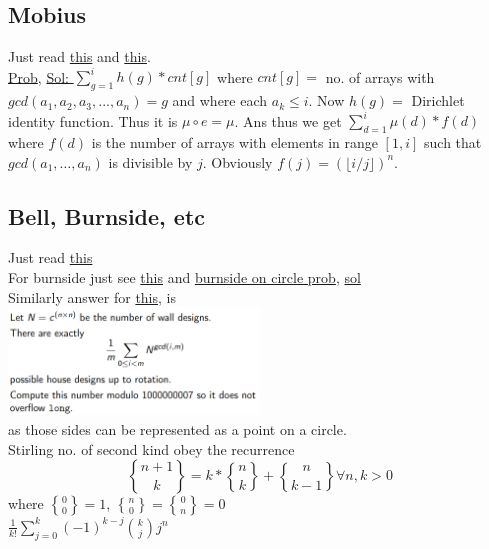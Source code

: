 \documentclass[8pt, a4paper, oneside, twocolumn]{extarticle}
\DeclareRobustCommand{\stirling}{\genfrac\{\}{0pt}{}}
\begin{document}
\subsection{Mobius}
Just read \href{https://github.com/sourabh2311/Competitive-Programming/blob/master/Reference%20Notes/Multiplicative.pdf}{this} and \href{https://www.quora.com/profile/Surya-Kiran/Posts/A-Dance-with-Mobius-Function}{this}.
\\\href{https://codeforces.com/contest/915/problem/G}{Prob}, \href{https://github.com/sourabh2311/Competitive-Programming/blob/master/CF/ER36/G.cpp}{Sol: }$\sum_{g = 1}^{i}h(g)*cnt[g]$ where $cnt[g] = $ no. of arrays with $gcd(a_1, a_2, a_3, ..., a_n) = g$ and where each $a_k \leq i$. Now $h(g) = $ Dirichlet identity function. Thus it is $\mu \circ e = \mu$. Ans thus we get $\sum_{d = 1}^{i}\mu(d)*f(d)$ where $f(d)$ is the number of arrays with elements in range $[1, i]$ such that $gcd(a_1, \dots, a_n)$ is divisible by $j$. Obviously $f(j) = (\lfloor i/j \rfloor)^n$.
\subsection{Bell, Burnside, etc}
Just read \href{https://github.com/sourabh2311/Competitive-Programming/blob/master/Reference%20Notes/cgt.pdf}{this}
\\For burnside just see \href{https://codeforces.com/blog/entry/62401}{this} and \href{http://poj.org/problem?id=1286}{burnside on circle prob}, \href{https://github.com/sourabh2311/Competitive-Programming/blob/master/IMP%20QUES/BURNSIDE/2.CPP}{sol}
\\Similarly answer for \href{http://gcpc.nwerc.eu/problemset_2017.pdf}{this}, is \\\includegraphics[width=0.5\textwidth,height=0.5\textheight,keepaspectratio]{brnsq}
\\as those sides can be represented as a point on a circle.
\\Stirling no. of second kind obey the recurrence $$\stirling{n + 1}{k} = k * \stirling{n}{k} + \stirling{n}{k - 1} \forall n, k > 0$$ where $\stirling{0}{0} = 1$, $\stirling{n}{0} = \stirling{0}{n} = 0$
\\$\frac{1}{k!}\sum_{j=0}^{k}(-1)^{k-j}\binom{k}{j}j^n$
\end{document}
